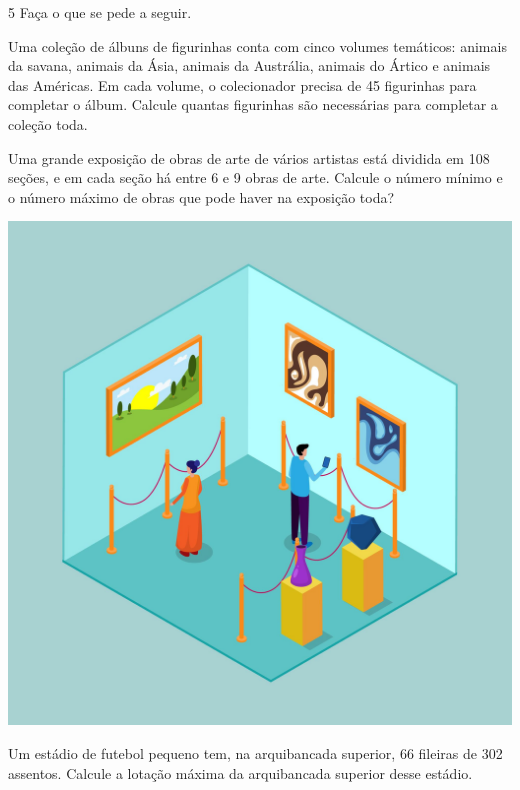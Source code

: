 \num{5} Faça o que se pede a seguir.

\begin{escolha}
\item Uma coleção de álbuns de figurinhas conta com cinco volumes temáticos: animais da savana, animais da Ásia, animais da Austrália, animais do Ártico e animais das Américas. Em cada volume, o colecionador precisa de 45 figurinhas para completar o álbum. Calcule quantas figurinhas são necessárias para completar a coleção toda.\\

\item Uma grande exposição de obras de arte de vários artistas está dividida em 108 seções, e em cada seção há entre 6 e 9 obras de arte. Calcule o número mínimo e o número máximo de obras que pode haver na exposição toda?
\end{escolha}

\begin{center}
\includegraphics[width=.5\textwidth]{media/image14c.jpeg}
\end{center}


\begin{escolha}[start=3]
\item Um estádio de futebol pequeno tem, na arquibancada superior, 66 fileiras de 302 assentos. Calcule a lotação máxima da arquibancada superior desse estádio.\\
\end{escolha}

